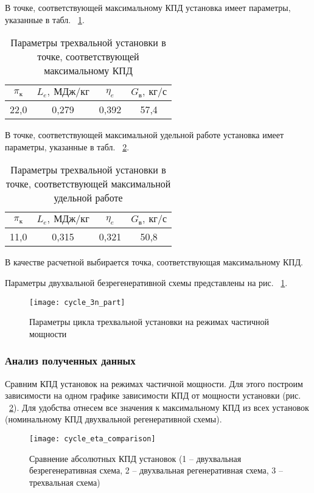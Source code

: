 В точке, соответствующей максимальному КПД установка имеет параметры, указанные в табл. ~\ref{tab:cycle_3n_max_eta}.

\begin{longtable}{|c|c|c|c|}
	\caption{Параметры трехвальной установки в точке, соответствующей максимальному КПД} 
	\label{tab:cycle_3n_max_eta}
	\hline
	\textbf{$\pi_к$} & \textbf{$L_e, \ МДж/кг$} & \textbf{$\eta_e$} & \textbf{$G_в, \ кг/с$} \\ \hline
	22,0 & 0,279 & 0,392 & 57,4 \\ \hline
\end{longtable}


В точке, соответствующей максимальной удельной работе установка имеет параметры, указанные в табл. ~\ref{tab:cycle_3n_max_labour}.
\begin{longtable}{|c|c|c|c|}
	\caption{Параметры трехвальной установки в точке, соответствующей максимальной удельной работе} 
	\label{tab:cycle_3n_max_labour}
	\hline
	\textbf{$\pi_к$} & \textbf{$L_e, \ МДж/кг$} & \textbf{$\eta_e$} & \textbf{$G_в, \ кг/с$} \\ \hline
	11,0 & 0,315 & 0,321 & 50,8 \\ \hline
\end{longtable}

В качестве расчетной выбирается точка, соответствующая максимальному КПД.

Параметры двухвальной безрегенеративной схемы представлены на рис. ~\ref{img:cycle_3n_part}.

\begin{figure}[H]
    \centering
    \texttt{[image: cycle\_3n\_part]}
    \caption{Параметры цикла трехвальной установки на режимах частичной мощности}
    \label{img:cycle_3n_part}
\end{figure}

\subsubsection{Анализ полученных данных}
Сравним КПД установок на режимах частичной мощности. Для этого построим зависимости на одном графике зависимости КПД от мощности установки (рис. ~\ref{img:cycle_eta_comparison}). Для удобства отнесем все значения к максимальному КПД из всех установок (номинальному КПД двухвальной регенеративной схемы).

\begin{figure}[H]
    \centering
    \texttt{[image: cycle\_eta\_comparison]}
    \caption{Сравнение абсолютных КПД установок (1 – двухвальная безрегенеративная схема, 2 – двухвальная регенеративная схема, 3 – трехвальная схема)}
    \label{img:cycle_eta_comparison}
\end{figure}

